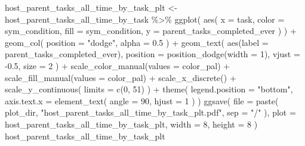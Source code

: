 \documentclass[
]{book}
\newenvironment{Shaded}{\begin{snugshade}}{\end{snugshade}}
\newcommand{\AttributeTok}[1]{\textcolor[rgb]{0.77,0.63,0.00}{#1}}
\newcommand{\DecValTok}[1]{\textcolor[rgb]{0.00,0.00,0.81}{#1}}
\newcommand{\FloatTok}[1]{\textcolor[rgb]{0.00,0.00,0.81}{#1}}
\newcommand{\FunctionTok}[1]{\textcolor[rgb]{0.00,0.00,0.00}{#1}}
\newcommand{\NormalTok}[1]{#1}
\newcommand{\OtherTok}[1]{\textcolor[rgb]{0.56,0.35,0.01}{#1}}
\newcommand{\SpecialCharTok}[1]{\textcolor[rgb]{0.00,0.00,0.00}{#1}}
\newcommand{\StringTok}[1]{\textcolor[rgb]{0.31,0.60,0.02}{#1}}
\begin{document}
\begin{Shaded}
\begin{Highlighting}[]
\NormalTok{host\_parent\_tasks\_all\_time\_by\_task\_plt }\OtherTok{\textless{}{-}}\NormalTok{ host\_parent\_tasks\_all\_time\_by\_task }\SpecialCharTok{\%\textgreater{}\%}
  \FunctionTok{ggplot}\NormalTok{(}
    \FunctionTok{aes}\NormalTok{(}
      \AttributeTok{x =}\NormalTok{ task,}
      \AttributeTok{color =}\NormalTok{ sym\_condition,}
      \AttributeTok{fill =}\NormalTok{ sym\_condition,}
      \AttributeTok{y =}\NormalTok{ parent\_tasks\_completed\_ever}
\NormalTok{    )}
\NormalTok{  ) }\SpecialCharTok{+}
  \FunctionTok{geom\_col}\NormalTok{(}
    \AttributeTok{position =} \StringTok{"dodge"}\NormalTok{,}
    \AttributeTok{alpha =} \FloatTok{0.5}
\NormalTok{  ) }\SpecialCharTok{+}
  \FunctionTok{geom\_text}\NormalTok{(}
    \FunctionTok{aes}\NormalTok{(}\AttributeTok{label =}\NormalTok{ parent\_tasks\_completed\_ever),}
    \AttributeTok{position =} \FunctionTok{position\_dodge}\NormalTok{(}\AttributeTok{width =} \DecValTok{1}\NormalTok{),}
    \AttributeTok{vjust =} \SpecialCharTok{{-}}\FloatTok{0.5}\NormalTok{,}
    \AttributeTok{size =} \DecValTok{2}
\NormalTok{  ) }\SpecialCharTok{+}
  \FunctionTok{scale\_color\_manual}\NormalTok{(}\AttributeTok{values =}\NormalTok{ color\_pal) }\SpecialCharTok{+}
  \FunctionTok{scale\_fill\_manual}\NormalTok{(}\AttributeTok{values =}\NormalTok{ color\_pal) }\SpecialCharTok{+}
  \FunctionTok{scale\_x\_discrete}\NormalTok{() }\SpecialCharTok{+}
  \FunctionTok{scale\_y\_continuous}\NormalTok{(}
    \AttributeTok{limits =} \FunctionTok{c}\NormalTok{(}\DecValTok{0}\NormalTok{, }\DecValTok{51}\NormalTok{)}
\NormalTok{  ) }\SpecialCharTok{+}
  \FunctionTok{theme}\NormalTok{(}
    \AttributeTok{legend.position =} \StringTok{"bottom"}\NormalTok{,}
    \AttributeTok{axis.text.x =} \FunctionTok{element\_text}\NormalTok{(}
      \AttributeTok{angle =} \DecValTok{90}\NormalTok{,}
      \AttributeTok{hjust =} \DecValTok{1}
\NormalTok{    )}
\NormalTok{  )}
\FunctionTok{ggsave}\NormalTok{(}
  \AttributeTok{file =} \FunctionTok{paste}\NormalTok{(}
\NormalTok{    plot\_dir,}
    \StringTok{"host\_parent\_tasks\_all\_time\_by\_task\_plt.pdf"}\NormalTok{,}
    \AttributeTok{sep =} \StringTok{"/"}
\NormalTok{  ),}
  \AttributeTok{plot =}\NormalTok{ host\_parent\_tasks\_all\_time\_by\_task\_plt,}
  \AttributeTok{width =} \DecValTok{8}\NormalTok{,}
  \AttributeTok{height =} \DecValTok{8}
\NormalTok{)}
\NormalTok{host\_parent\_tasks\_all\_time\_by\_task\_plt}
\end{Highlighting}
\end{Shaded}
\end{document}
